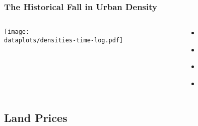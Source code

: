 \documentclass[aspectratio=169]{beamer}
\begin{document}


\begin{frame}[label=density]
\frametitle{The Historical Fall in Urban Density}
\begin{columns}
\begin{column}{0.9\textwidth}
\texttt{[image: \\dataplots/densities-time-log.pdf]}
\end{column}
\begin{column}{0.2\textwidth}
\begin{itemize}
\item[] \hyperlink{Paris}{}
\item[] \hyperlink{violins}{}
\item[] \hyperlink{Top5}{}
\item[] \hyperlink{world_sample_city}{}
\end{itemize}
\end{column}

\end{columns}
\end{frame}



\subsection{Land Prices}
\end{document}
